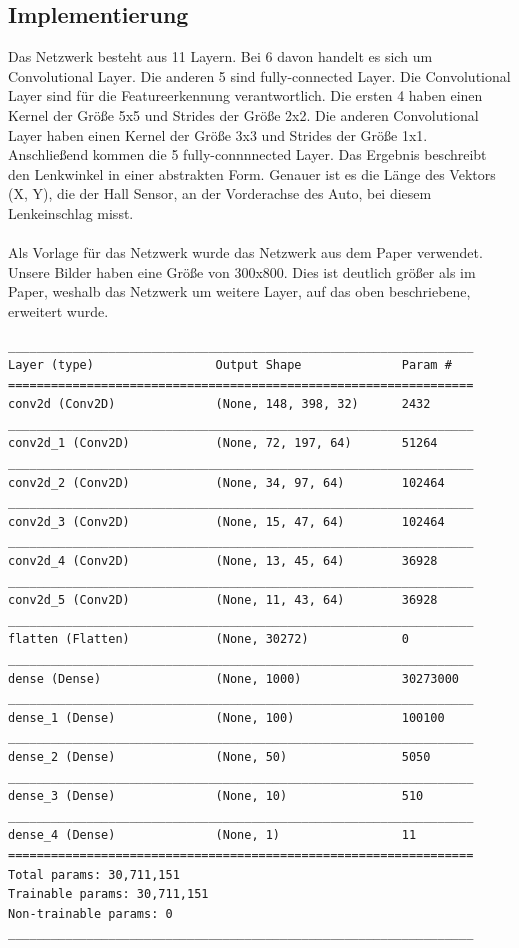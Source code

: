 \documentclass[a4paper, 12pt]{scrartcl}
\begin{document}
			\subsection{Implementierung}
			Das Netzwerk besteht aus 11 Layern. Bei 6 davon handelt es sich um Convolutional Layer. Die anderen 5 sind fully-connected Layer. Die Convolutional Layer sind für die Featureerkennung verantwortlich. Die ersten 4 haben einen Kernel der Größe 5x5 und Strides der Größe 2x2. Die anderen Convolutional Layer haben einen Kernel der Größe 3x3 und Strides der Größe 1x1. Anschließend kommen die 5 fully-connnnected Layer. Das Ergebnis beschreibt den Lenkwinkel in einer abstrakten Form. Genauer ist es die Länge des Vektors (X, Y), die der Hall Sensor, an der Vorderachse des Auto, bei diesem Lenkeinschlag misst.\\ \\
			Als Vorlage für das Netzwerk wurde das Netzwerk aus dem Paper \cite{article} verwendet. Unsere Bilder haben eine Größe von 300x800. Dies ist deutlich größer als im Paper, weshalb das Netzwerk um weitere Layer, auf das oben beschriebene, erweitert wurde.
		
			\begin{verbatim}		
_________________________________________________________________
Layer (type)                 Output Shape              Param #   
=================================================================
conv2d (Conv2D)              (None, 148, 398, 32)      2432      
_________________________________________________________________
conv2d_1 (Conv2D)            (None, 72, 197, 64)       51264     
_________________________________________________________________
conv2d_2 (Conv2D)            (None, 34, 97, 64)        102464    
_________________________________________________________________
conv2d_3 (Conv2D)            (None, 15, 47, 64)        102464    
_________________________________________________________________
conv2d_4 (Conv2D)            (None, 13, 45, 64)        36928     
_________________________________________________________________
conv2d_5 (Conv2D)            (None, 11, 43, 64)        36928     
_________________________________________________________________
flatten (Flatten)            (None, 30272)             0         
_________________________________________________________________
dense (Dense)                (None, 1000)              30273000  
_________________________________________________________________
dense_1 (Dense)              (None, 100)               100100    
_________________________________________________________________
dense_2 (Dense)              (None, 50)                5050      
_________________________________________________________________
dense_3 (Dense)              (None, 10)                510       
_________________________________________________________________
dense_4 (Dense)              (None, 1)                 11        
=================================================================
Total params: 30,711,151
Trainable params: 30,711,151
Non-trainable params: 0
_________________________________________________________________
			\end{verbatim}
			
\end{document}
